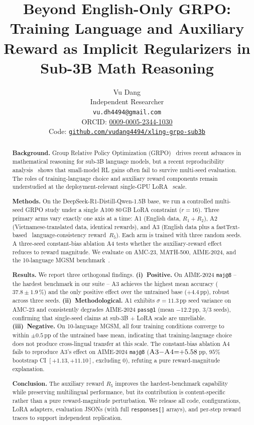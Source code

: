 \documentclass[11pt]{article}
\title{Beyond English-Only GRPO: Training Language and Auxiliary Reward
       as Implicit Regularizers in Sub-3B Math Reasoning}
\author{Vu Dang \\
  Independent Researcher \\
  \texttt{vu.dh4494@gmail.com} \\
  ORCID: \href{https://orcid.org/0009-0005-2344-1030}{0009-0005-2344-1030} \\
  Code: \href{https://github.com/vudang4494/xling-grpo-sub3b}%
             {\nolinkurl{github.com/vudang4494/xling-grpo-sub3b}}}
\newcommand{\armA}{\textsc{A1}}
\newcommand{\armB}{\textsc{A2}}
\newcommand{\armC}{\textsc{A3}}
\newcommand{\armD}{\textsc{A4}}
\begin{document}
\maketitle

\begin{abstract}
\noindent\textbf{Background.}
Group Relative Policy Optimization
(GRPO)~\cite{deepseekmath_2024,deepseekR1_2025} drives recent advances in
mathematical reasoning for sub-3B language models, but a recent
reproducibility analysis~\cite{sober_look_2025} shows that small-model RL
gains often fail to survive multi-seed evaluation. The roles of
training-language choice and auxiliary reward components remain
understudied at the deployment-relevant single-GPU
LoRA~\cite{hu2022lora} scale.

\noindent\textbf{Methods.}
On the DeepSeek-R1-Distill-Qwen-1.5B base, we run a controlled multi-seed
GRPO study under a single A100 80\,GB LoRA constraint ($r{=}16$). Three
primary arms vary exactly one axis at a time: \armA{} (English data,
$R_1{+}R_2$), \armB{} (Vietnamese-translated data, identical rewards),
and \armC{} (English data plus a fastText-based~\cite{joulin2017fasttext}
language-consistency reward~$R_5$). Each arm is trained with three random
seeds. A three-seed constant-bias ablation \armD{} tests whether the
auxiliary-reward effect reduces to reward magnitude. We evaluate on
AMC-23, MATH-500, AIME-2024, and the 10-language MGSM
benchmark~\cite{mgsm_2022}.

\noindent\textbf{Results.}
We report three orthogonal findings.
\textbf{(i)~Positive.} On AIME-2024 \texttt{maj@8} -- the hardest benchmark
in our suite -- \armC{} achieves the highest mean accuracy
($37.8 \pm 1.9$\,\%) and the only positive effect over the untrained base
($+4.4$\,pp), robust across three seeds.
\textbf{(ii)~Methodological.} \armA{} exhibits $\sigma{=}11.3$\,pp seed
variance on AMC-23 and consistently degrades AIME-2024 \texttt{pass@1}
(mean $-12.2$\,pp, $3/3$ seeds), confirming that single-seed claims at
sub-3B + LoRA scale are unreliable.
\textbf{(iii)~Negative.} On 10-language MGSM, all four training
conditions converge to within $\pm 0.5$\,pp of the untrained base mean,
indicating that training-language choice does not produce cross-lingual
transfer at this scale. The constant-bias ablation \armD{} fails to
reproduce \armC{}'s effect on AIME-2024 \texttt{maj@8}
($\armC{}{-}\armD{}{=}{+}5.58$\,pp, $95\%$ bootstrap CI
$[+1.13, +11.10]$, excluding $0$), refuting a pure reward-magnitude
explanation.

\noindent\textbf{Conclusion.}
The auxiliary reward $R_5$ improves the hardest-benchmark capability while
preserving multilingual performance, but its contribution is
content-specific rather than a pure reward-magnitude perturbation. We
release all code, configurations, LoRA adapters, evaluation JSONs (with
full \texttt{responses[]} arrays), and per-step reward traces to support
independent replication.
\end{abstract}
\end{document}
